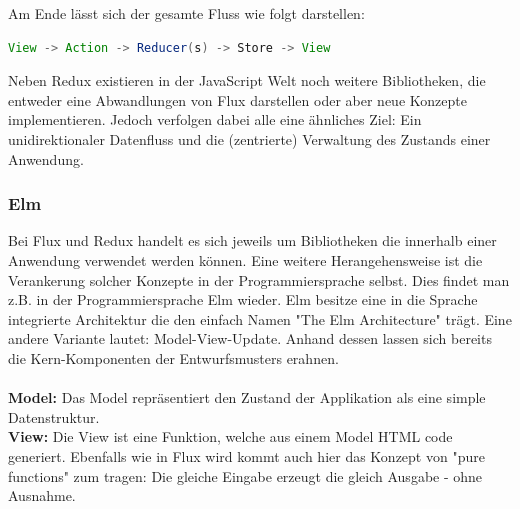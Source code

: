 Am Ende lässt sich der gesamte Fluss wie folgt darstellen:
\\
\begin{lstlisting}[frame=single, language=Java]
View -> Action -> Reducer(s) -> Store -> View
\end{lstlisting}
\bigskip
Neben Redux existieren in der JavaScript Welt noch weitere Bibliotheken, die entweder eine Abwandlungen von Flux darstellen oder aber neue Konzepte implementieren. Jedoch verfolgen dabei alle eine ähnliches Ziel: Ein unidirektionaler Datenfluss und die (zentrierte) Verwaltung des Zustands einer Anwendung.

\subsubsection{Elm}
Bei Flux und Redux handelt es sich jeweils um Bibliotheken die innerhalb einer Anwendung verwendet werden können. Eine weitere Herangehensweise ist die Verankerung solcher Konzepte in der Programmiersprache selbst. Dies findet man z.B. in
der Programmiersprache Elm
\cite{elmIntroduction}
wieder. Elm besitze eine in die Sprache integrierte Architektur die den einfach Namen "The Elm Architecture" 
\cite{theElmArchitecture}
trägt. Eine andere Variante lautet: Model-View-Update. Anhand dessen lassen sich bereits die Kern-Komponenten der Entwurfsmusters erahnen.
\\
\\
\textbf{Model:} Das Model repräsentiert den Zustand der Applikation als eine simple Datenstruktur.
\\
\textbf{View:} Die View ist eine Funktion, welche aus einem Model HTML code generiert. Ebenfalls wie in Flux wird kommt auch hier das Konzept von "pure functions" zum tragen: Die gleiche Eingabe erzeugt die gleich Ausgabe - ohne Ausnahme.
